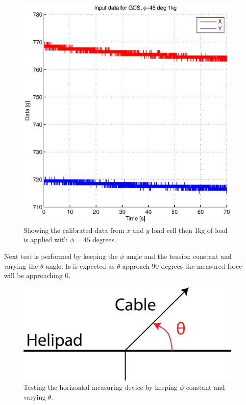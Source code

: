 \begin{figure}[hbtp]
\centering
\includegraphics[scale=1]{graphics/gcs_test/phi45deg1kgdata.eps}
\caption[Calibrated data from $x$ and $y$ load cell]{Showing the calibrated data from $x$ and $y$ load cell then 1kg of load is applied with $\phi=45$ degrees.}
\label{fig:phi45deg1kgdata}
\end{figure}



\noindent
Next test is performed by keeping the $\phi$ angle and the tension constant and varying the $\theta$ angle. Is is expected as $\theta$ approach $90$ degrees the measured force will be approaching $0$. 
\begin{figure}[H]
\centering
\includegraphics[scale=0.75]{graphics/loadcell_test2.png}
\caption{Testing the horizontal measuring device by keeping $\phi$ constant and varying $\theta$.}
\label{fig:loadcell_test2}
\end{figure}

